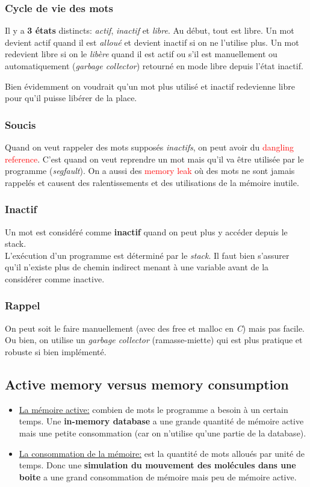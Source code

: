 \documentclass{report}
\begin{document}
\subsubsection{Cycle de vie des mots}
Il y a \textbf{3 états} distincts: \textit{actif}, \textit{inactif} et \textit{libre}. Au début, tout est libre. Un mot devient actif quand il est \textit{alloué} et devient inactif si on ne l'utilise plus. Un mot redevient libre si on le \textit{libère} quand il est actif ou s'il est manuellement ou automatiquement (\textit{garbage collector}) retourné en mode libre depuis l'état inactif.\par 
Bien évidemment on voudrait qu'un mot plus utilisé et inactif redevienne libre pour qu'il puisse libérer de la place.

\subsubsection{Soucis}
Quand on veut rappeler des mots supposés \textit{inactifs}, on peut avoir du \textcolor{red}{dangling reference}. C'est quand on veut reprendre un mot mais qu'il va être utilisée par le programme (\textit{segfault}). On a aussi des \textcolor{red}{memory leak} où des mots ne sont jamais rappelés et causent des ralentissements et des utilisations de la mémoire inutile.

\subsubsection{Inactif}
Un mot est considéré comme \textbf{inactif} quand on peut plus y accéder depuis le stack.\\
L'exécution d'un programme est déterminé par le \textit{stack}. Il faut bien s'assurer qu'il n'existe plus de chemin indirect menant à une variable avant de la considérer comme inactive.

\subsubsection{Rappel}
On peut soit le faire manuellement (avec des free et malloc en \textit{C}) mais pas facile. Ou bien, on utilise un \textit{garbage collector} (ramasse-miette) qui est plus pratique et robuste si bien implémenté.

\subsection{Active memory versus memory consumption}
\begin{itemize}
\item \underline{La mémoire active:} combien de mots le programme a besoin à un certain temps. Une \textbf{in-memory database} a une grande quantité de mémoire active mais une petite consommation (car on n'utilise qu'une partie de la database).
\item \underline{La consommation de la mémoire:} est la quantité de mots alloués par unité de temps. Donc une \textbf{simulation du mouvement des molécules dans une boite} a une grand consommation de mémoire mais peu de mémoire active.
\end{itemize}
\end{document}
